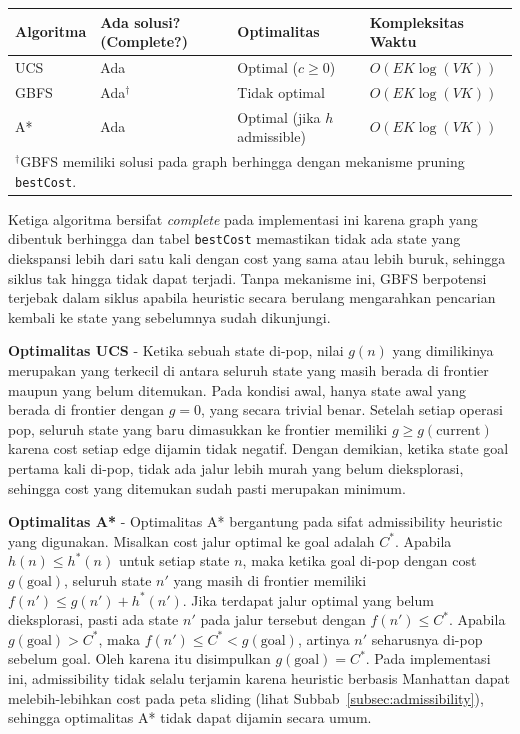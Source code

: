 \documentclass[a4paper,11pt]{article}
\begin{document}
\begin{longtable}{|p{2.5cm}|p{2.5cm}|p{3.5cm}|p{5cm}|}
    \hline
    \textbf{Algoritma} & \textbf{Ada solusi? (Complete?)} & \textbf{Optimalitas} & \textbf{Kompleksitas Waktu} \\
    \hline
    \endhead
    UCS & Ada & Optimal ($c \geq 0$) & $O(EK \log(VK))$ \\
    \hline
    GBFS & Ada$^\dagger$ & Tidak optimal & $O(EK \log(VK))$ \\
    \hline
    A* & Ada & Optimal (jika $h$ admissible) & $O(EK \log(VK))$ \\
    \hline
    \multicolumn{4}{l}{\footnotesize $^\dagger$GBFS memiliki solusi pada graph berhingga dengan mekanisme pruning \texttt{bestCost}.} \\
\end{longtable}

Ketiga algoritma bersifat \textit{complete} pada implementasi ini karena graph yang dibentuk berhingga dan tabel \texttt{bestCost} memastikan tidak ada state yang diekspansi lebih dari satu kali dengan cost yang sama atau lebih buruk, sehingga siklus tak hingga tidak dapat terjadi. Tanpa mekanisme ini, GBFS berpotensi terjebak dalam siklus apabila heuristic secara berulang mengarahkan pencarian kembali ke state yang sebelumnya sudah dikunjungi.

\textbf{Optimalitas UCS} - Ketika sebuah state di-pop, nilai $g(n)$ yang dimilikinya merupakan yang terkecil di antara seluruh state yang masih berada di frontier maupun yang belum ditemukan. Pada kondisi awal, hanya state awal yang berada di frontier dengan $g = 0$, yang secara trivial benar. Setelah setiap operasi pop, seluruh state yang baru dimasukkan ke frontier memiliki $g \geq g(\text{current})$ karena cost setiap edge dijamin tidak negatif. Dengan demikian, ketika state goal pertama kali di-pop, tidak ada jalur lebih murah yang belum dieksplorasi, sehingga cost yang ditemukan sudah pasti merupakan minimum.

\textbf{Optimalitas A*}  - Optimalitas A* bergantung pada sifat admissibility heuristic yang digunakan. Misalkan cost jalur optimal ke goal adalah $C^*$. Apabila $h(n) \leq h^*(n)$ untuk setiap state $n$, maka ketika goal di-pop dengan cost $g(\text{goal})$, seluruh state $n'$ yang masih di frontier memiliki $f(n') \leq g(n') + h^*(n')$. Jika terdapat jalur optimal yang belum dieksplorasi, pasti ada state $n'$ pada jalur tersebut dengan $f(n') \leq C^*$. Apabila $g(\text{goal}) > C^*$, maka $f(n') \leq C^* < g(\text{goal})$, artinya $n'$ seharusnya di-pop sebelum goal. Oleh karena itu disimpulkan $g(\text{goal}) = C^*$. Pada implementasi ini, admissibility tidak selalu terjamin karena heuristic berbasis Manhattan dapat melebih-lebihkan cost pada peta sliding (lihat Subbab~\ref{subsec:admissibility}), sehingga optimalitas A* tidak dapat dijamin secara umum.
\end{document}
